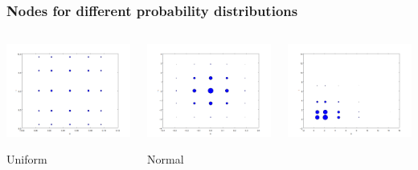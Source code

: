 \documentclass{beamer}
\begin{document}
  \begin{frame}
 \frametitle{Nodes for different probability distributions}
 \begin{columns}
     \begin{center}
                \includegraphics[width=.7\textwidth]{nodes_uniform.png}

                Uniform
     \end{center}

     \begin{center}
                \includegraphics[width=.7\textwidth]{nodes_normal.png}

                Normal
     \end{center}
     \begin{center}
                \includegraphics[width=.7\textwidth]{nodes_gamma.png}


\end{center}
\end{columns}
\end{frame}
\end{document}
